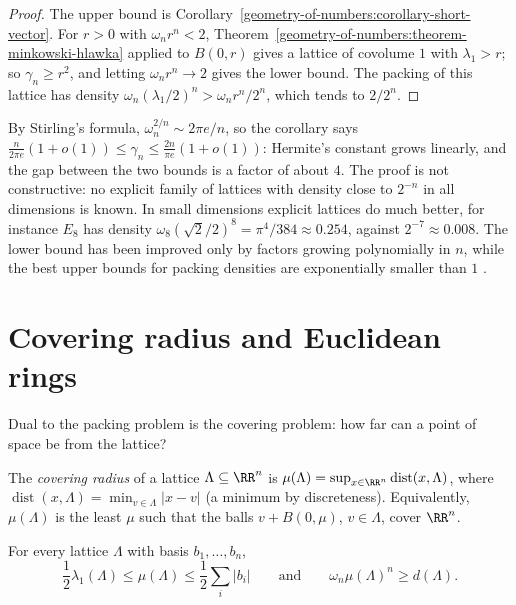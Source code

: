 \begin{proof}
The upper bound is Corollary~\ref{geometry-of-numbers:corollary-short-vector}. For $r > 0$ with $\omega_nr^n < 2$, Theorem~\ref{geometry-of-numbers:theorem-minkowski-hlawka} applied to $B(0, r)$ gives
a lattice of covolume $1$ with $\lambda_1 > r$; so $\gamma_n \geq r^2$, and letting $\omega_nr^n \to 2$ gives the lower bound. The packing of this lattice has density
$\omega_n(\lambda_1/2)^n > \omega_nr^n/2^n$, which tends to $2/2^n$.
\end{proof}

\begin{remark}\label{geometry-of-numbers:remark-minkowski-hlawka}
By Stirling's formula, $\omega_n^{2/n} \sim 2\pi e/n$, so the corollary says $\frac{n}{2\pi e}(1 + o(1)) \leq \gamma_n \leq \frac{2n}{\pi e}(1 + o(1))$: Hermite's constant grows linearly, and the gap between
the two bounds is a factor of about $4$. The proof is not constructive: no explicit family of lattices with density close to $2^{-n}$ in all dimensions is known. In small dimensions explicit lattices do
much better, for instance $E_8$ has density $\omega_8(\sqrt2/2)^8 = \pi^4/384 \approx 0.254$, against $2^{-7} \approx 0.008$. The lower bound has been improved only by factors growing polynomially in $n$,
while the best upper bounds for packing densities are exponentially smaller than $1$ \cite{conway-sloane}.
\end{remark}

\section{Covering radius and Euclidean rings}\label{geometry-of-numbers:section-covering}

Dual to the packing problem is the covering problem: how far can a point of space be from the lattice?

\begin{definition}\label{geometry-of-numbers:definition-covering-radius}
The \emph{covering radius} of a lattice $\Lambda \subseteq \RR^n$ is $\mu(\Lambda) = \sup_{x \in \RR^n}\operatorname{dist}(x, \Lambda)$, where $\operatorname{dist}(x, \Lambda) = \min_{v \in \Lambda}|x - v|$ (a
minimum by discreteness). Equivalently, $\mu(\Lambda)$ is the least $\mu$ such that the balls $v + B(0, \mu)$, $v \in \Lambda$, cover $\RR^n$.
\end{definition}

\begin{proposition}\label{geometry-of-numbers:proposition-covering-radius}
For every lattice $\Lambda$ with basis $b_1, \ldots, b_n$,
\[
\frac12\lambda_1(\Lambda) \leq \mu(\Lambda) \leq \frac12\sum_i|b_i| \qquad\text{and}\qquad \omega_n\mu(\Lambda)^n \geq d(\Lambda).
\]
\end{proposition}

